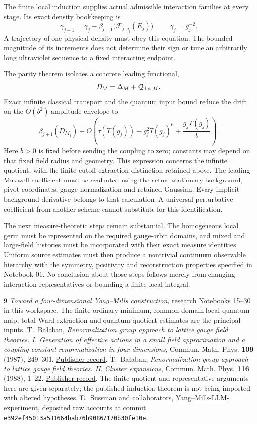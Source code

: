 \documentclass[11pt]{article}
\theoremstyle{remark}
\begin{document}
The finite local induction supplies actual admissible interaction
families at every stage. Its exact density bookkeeping is
\[
 \gamma_{j+1}=\gamma_j-
      \beta_{j+1}\bigl(\mathcal F_{j,g_j}(E_j)\bigr),
 \qquad \gamma_j=g_j^{-2}.
\]
A trajectory of one physical density must obey this equation.
The bounded magnitude of its increments does not determine their
sign or tune an arbitrarily long ultraviolet sequence to a fixed
interacting endpoint.

The parity theorem isolates a concrete leading functional,
\[
 D_M=\Delta_M+\mathcal Q_{{\rm det},M}.
\]
Exact infinite classical transport and the quantum input bound
reduce the drift on the \(O(b^2)\) amplitude envelope to
\[
 \beta_{j+1}(D_{M_j})+
 O\!\left(\tau(T(g_j))+g_j^2T(g_j)^6+
                         \frac{g_jT(g_j)}b\right).
\]
Here \(b>0\) is fixed before sending the coupling to zero;
constants may depend on that fixed field radius and geometry.
This expression concerns the infinite quotient, with the
finite cutoff-extraction distinction retained above.
The leading Maxwell coefficient must be evaluated using the actual
stationary background, pivot coordinates, gauge normalization and
retained Gaussian. Every implicit background derivative belongs
to that calculation. A universal perturbative coefficient from
another scheme cannot substitute for this identification.

The next measure-theoretic steps remain substantial. The homogeneous
local germ must be represented on the required gauge-orbit domains,
and mixed and large-field histories must be incorporated with their
exact measure identities. Uniform source estimates must then produce
a nontrivial continuum observable hierarchy with the symmetry,
positivity and reconstruction properties specified in Notebook 01.
No conclusion about those steps follows merely from changing
interaction representatives or bounding a finite local integral.

\begin{thebibliography}{9}
\emph{Toward a four-dimensional Yang--Mills construction},
research Notebooks 15--30 in this workspace. The finite ordinary
minimum, common-domain local quantum map, total Ward extraction
and quantum quotient estimates are the principal inputs.
T.~Ba\l aban,
\emph{Renormalization group approach to lattice gauge field
theories. I. Generation of effective actions in a small field
approximation and a coupling constant renormalization in four
dimensions},
Commun. Math. Phys. \textbf{109} (1987), 249--301.
\href{https://doi.org/10.1007/BF01215223}{Publisher record}.
T.~Ba\l aban,
\emph{Renormalization group approach to lattice gauge field
theories. II. Cluster expansions},
Commun. Math. Phys. \textbf{116} (1988), 1--22.
\href{https://doi.org/10.1007/BF01239022}{Publisher record}.
The finite quotient and representative arguments here are given
separately; the published induction theorem is not being imported
with altered hypotheses.
E.~Sussman and collaborators,
\href{https://github.com/ethanwsussman/Yang--Mills-LLM-experiment}
{Yang--Mills-LLM-experiment}, deposited raw accounts at commit
\texttt{e392ef45013a581664bab76b90867170b30fe10e}.
\end{thebibliography}
\end{document}
